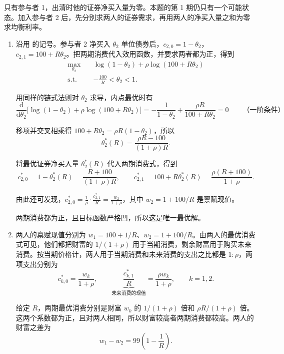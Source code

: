 \begin{solution}[blank-type=manual,blank-vsep=9\baselineskip]
 只有参与者 1，出清时他的证券净买入量为零。本题的第 1 期仍只有一个可能状态。加入参与者 2 后，先分别求两人的证券需求，再用两人的净买入量之和为零求均衡利率。

\begin{enumerate}[label=(\alph*)]
    \item 沿用 的记号。参与者 2 净买入 $\theta_2$ 单位债券后，$c_{2,0}=1-\theta_2$，$c_{2,1}=100+R\theta_2$。把两期消费代入效用函数，并要求两者都为正，得到
    \[
        \begin{aligned}
            \max_{\theta_2}\quad &\log(1-\theta_2)+\rho\log(100+R\theta_2)\\
            \text{s.t.}\quad &-\frac{100}{R}<\theta_2<1.
        \end{aligned}
    \]

    用同样的链式法则对 $\theta_2$ 求导，内点最优时有
    \[
        \frac{\mathrm d}{\mathrm d\theta_2}
        \bigl[\log(1-\theta_2)+\rho\log(100+R\theta_2)\bigr]
        =-\frac{1}{1-\theta_2}+\frac{\rho R}{100+R\theta_2}
        =0\qquad\text{（一阶条件）}
    \]

    移项并交叉相乘得 $100+R\theta_2=\rho R(1-\theta_2)$，所以
    \[
        \theta_2^*(R)=\frac{\rho R-100}{(1+\rho)R}.
    \]

    将最优证券净买入量 $\theta_2^*(R)$ 代入两期消费式，得到
    \[
        c_{2,0}^{*}=1-\theta_2^*(R)=\frac{R+100}{(1+\rho)R},\qquad
        c_{2,1}^{*}=100+R\theta_2^*(R)=\frac{\rho(R+100)}{1+\rho}.
    \]

    由此还可发现，$c_{2,0}^*=\frac{1}{\rho}\cdot\frac{c_{2,1}^*}{R}=\frac{w_2}{1+\rho}$，其中 $w_2=1+100/R$ 是禀赋现值。

    两期消费都为正，且目标函数严格凹，所以这是唯一最优解。
    \item 两人的禀赋现值分别为 $w_1=100+1/R$、$w_2=1+100/R$。由两人的最优消费式可见，他们都把财富的 $1/(1+\rho)$ 用于当期消费，剩余财富用于购买未来消费。按当期价格计，两人用于当期消费和未来消费的支出之比都是 $1:\rho$，两项支出分别为
    \[
      c_{k,0}^*=\frac{w_k}{1+\rho},\qquad
      \underbrace{\frac{c_{k,1}^*}{R}}_{\text{未来消费的现值}}
      =\frac{\rho w_k}{1+\rho},\qquad k=1,2.
    \]

    给定 $R$，两期最优消费分别是财富 $w_k$ 的 $1/(1+\rho)$ 倍和 $\rho R/(1+\rho)$ 倍。这两个系数都为正，且对两人相同，所以财富较高者两期消费都较高。两人的财富之差为
    \[
      w_1-w_2=99\left(1-\frac1R\right).
    \]


\end{enumerate}
\end{solution}
